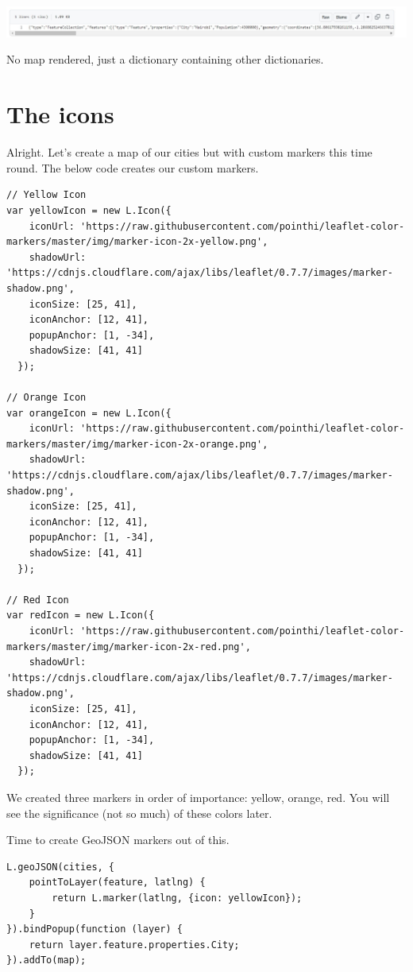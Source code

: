\documentclass[
]{book}
\begin{document}
\includegraphics{../images/geojson-nowebmap.jpg}

No map rendered, just a dictionary containing other dictionaries.

\hypertarget{the-icons}{%
\section{The icons}\label{the-icons}}

Alright. Let's create a map of our cities but with custom markers this time round. The below code creates our custom markers.

\begin{verbatim}
// Yellow Icon
var yellowIcon = new L.Icon({
    iconUrl: 'https://raw.githubusercontent.com/pointhi/leaflet-color-markers/master/img/marker-icon-2x-yellow.png',
    shadowUrl: 'https://cdnjs.cloudflare.com/ajax/libs/leaflet/0.7.7/images/marker-shadow.png',
    iconSize: [25, 41],
    iconAnchor: [12, 41],
    popupAnchor: [1, -34],
    shadowSize: [41, 41]
  });

// Orange Icon
var orangeIcon = new L.Icon({
    iconUrl: 'https://raw.githubusercontent.com/pointhi/leaflet-color-markers/master/img/marker-icon-2x-orange.png',
    shadowUrl: 'https://cdnjs.cloudflare.com/ajax/libs/leaflet/0.7.7/images/marker-shadow.png',
    iconSize: [25, 41],
    iconAnchor: [12, 41],
    popupAnchor: [1, -34],
    shadowSize: [41, 41]
  });

// Red Icon
var redIcon = new L.Icon({
    iconUrl: 'https://raw.githubusercontent.com/pointhi/leaflet-color-markers/master/img/marker-icon-2x-red.png',
    shadowUrl: 'https://cdnjs.cloudflare.com/ajax/libs/leaflet/0.7.7/images/marker-shadow.png',
    iconSize: [25, 41],
    iconAnchor: [12, 41],
    popupAnchor: [1, -34],
    shadowSize: [41, 41]
  });
\end{verbatim}

We created three markers in order of importance: yellow, orange, red. You will see the significance (not so much) of these colors later.

Time to create GeoJSON markers out of this.

\begin{verbatim}
L.geoJSON(cities, {
    pointToLayer(feature, latlng) {
        return L.marker(latlng, {icon: yellowIcon});
    }
}).bindPopup(function (layer) {
    return layer.feature.properties.City;
}).addTo(map);
\end{verbatim}
\end{document}
